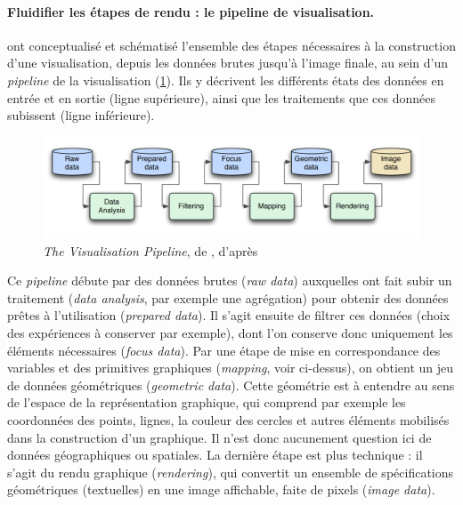 \paragraph{Fluidifier les étapes de rendu : le \og pipeline de visualisation\fg{}.}\label{par:visualisation-pipeline}

\textcite{dos_santos_gaining_2004} ont conceptualisé et schématisé l'ensemble des étapes nécessaires à la construction d'une visualisation, depuis les données brutes jusqu'à l'image finale, au sein d'un \og \textit{pipeline}\fg{} de la visualisation (\cref{fig:visualisation-pipeline}).
Ils y décrivent les différents états des données en entrée et en sortie (ligne supérieure), ainsi que les traitements que ces données subissent (ligne inférieure).

\begin{figure}[H]
	\centering
	\includegraphics[width=\linewidth]{img/Visualisation_Pipeline_p92.png}
	\caption[\og \textit{The Visualisation Pipeline}\fg{}.]{\og \textit{The Visualisation Pipeline}\fg{}, de \textcite[92]{keim_mastering_2010}, d'après \textcite[314]{dos_santos_gaining_2004}}
	\label{fig:visualisation-pipeline}
\end{figure}

Ce \textit{pipeline} débute par des données brutes (\textit{raw data}) auxquelles ont fait subir un traitement (\textit{data analysis}, par exemple une agrégation) pour obtenir des données prêtes à l'utilisation (\textit{prepared data}).
Il s'agit ensuite de filtrer ces données (choix des expériences à conserver par exemple), dont l'on conserve donc uniquement les éléments nécessaires (\textit{focus data}).
Par une étape de mise en correspondance des variables et des primitives graphiques (\textit{mapping}, voir ci-dessus), on obtient un jeu de données \og géométriques \fg{} (\textit{geometric data}).
Cette géométrie est à entendre au sens de l'espace de la représentation graphique, qui comprend par exemple les coordonnées des points, lignes, la couleur des cercles et autres éléments mobilisés dans la construction d'un graphique.
Il n'est donc aucunement question ici de données géographiques ou spatiales.
La dernière étape est plus technique : il s'agit du rendu graphique (\textit{rendering}), qui convertit un ensemble de spécifications géométriques (textuelles) en une image affichable, faite de pixels (\textit{image data}).


